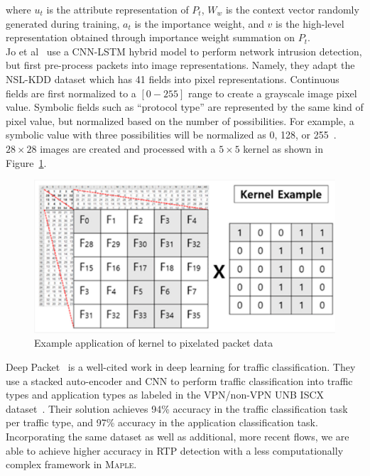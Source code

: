 where $u_t$ is the attribute representation of $P_t$, $W_w$ is the context vector randomly generated during training, $a_t$ is the importance weight, and $v$ is the high-level representation obtained through importance weight summation on $P_t$. \\

Jo et al~\cite{jo2020packet} use a CNN-LSTM hybrid model to perform network intrusion detection, but first pre-process packets into image representations. Namely, they adapt the NSL-KDD dataset which has 41 fields into pixel representations. Continuous fields are first normalized to a $[0-255]$ range to create a grayscale image pixel value. Symbolic fields such as ``protocol type'' are represented by the same kind of pixel value, but normalized based on the number of possibilities. For example, a symbolic value with three possibilities will be normalized as 0, 128, or 255~\cite{jo2020packet}. $28 \times 28$ images are created and processed with a $5 \times 5$ kernel as shown in Figure~\ref{fig:kernel}.

\begin{figure} [h!]
\includegraphics[width=\linewidth]{chapters/5/img/kernel.png}
\caption{Example application of kernel to pixelated packet data~\cite{jo2020packet}}
\label{fig:kernel}
\end{figure}

Deep Packet~\cite{deeppacket} is a well-cited work in deep learning for traffic classification. They use a stacked auto-encoder and CNN to perform traffic classification into traffic types and application types as labeled in the VPN/non-VPN UNB ISCX dataset~\cite{vpn-dataset}. Their solution achieves 94\% accuracy in the traffic classification task per traffic type, and 97\% accuracy in the application classification task. Incorporating the same dataset as well as additional, more recent flows, we are able to achieve higher accuracy in RTP detection with a less computationally complex framework in \textsc{Maple}.
